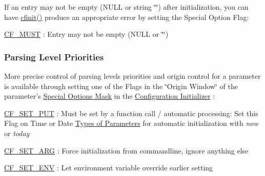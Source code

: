 If an entry may not be empty ({\ttfamily N\-U\-L\-L} or string \char`\"{}\char`\"{}) after initialization, you can have \hyperlink{group__cflib__core_ga64fb341565c2ddfccd6669e5e6265a8a}{cfinit()} produce an appropriate error by setting the Special Option Flag\-:


\begin{DoxyItemize}
\item \hyperlink{group__special__options__mask_ga3229f5b038eaa0c6428361d2aa510dfc}{C\-F\-\_\-\-M\-U\-S\-T} \-: Entry may not be empty ({\ttfamily N\-U\-L\-L} or \char`\"{}\char`\"{}) 
\end{DoxyItemize}\hypertarget{config_levels_parsing_level_priorities}{}\subsubsection{Parsing Level Priorities}\label{config_levels_parsing_level_priorities}
More precise control of parsing levels priorities and origin control for a parameter is available through setting one of the Flags in the \char`\"{}\-Origin Window\char`\"{} of the parameter's \hyperlink{group__special__options__mask}{Special Options Mask} in the \hyperlink{config_initializer}{Configuration Initializer} \-:


\begin{DoxyItemize}
\item \hyperlink{group__special__options__mask_ga8d6cd1608fef5638efe964da63edf2dd}{C\-F\-\_\-\-S\-E\-T\-\_\-\-P\-U\-T} \-: Must be set by a function call / automatic processing\-: Set this Flag on Time or Date \hyperlink{parameter_types}{Types of Parameters} for automatic initialization with {\itshape now\/} or {\itshape today\/} 
\end{DoxyItemize}


\begin{DoxyItemize}
\item \hyperlink{group__special__options__mask_ga1b3eb474a5160e5a32385f6de53d90d6}{C\-F\-\_\-\-S\-E\-T\-\_\-\-A\-R\-G} \-: Force initialization from commandline, ignore anything else
\end{DoxyItemize}


\begin{DoxyItemize}
\item \hyperlink{group__special__options__mask_ga29dbd098a75a23ddc42b3b53e430d694}{C\-F\-\_\-\-S\-E\-T\-\_\-\-E\-N\-V} \-: Let environment variable override earlier setting
\end{DoxyItemize}



